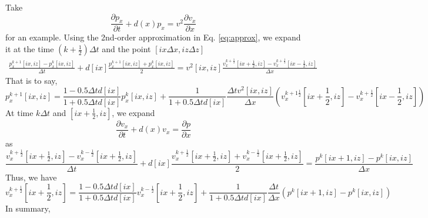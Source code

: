 Take
\begin{displaymath}
\frac{\partial p_x}{\partial t}+d(x)p_x = v^2 \frac{\partial v_x}{\partial x}
\end{displaymath}
for an example. Using the 2nd-order approximation in Eq. \eqref{eq:approx}, we expand it at the time $(k+\frac{1}{2})\Delta t$ and the point $[ix\Delta x, iz\Delta z]$
\begin{equation}
\begin{split} 
\frac{p_x^{k+1}[ix, iz]-p_x^{k}[ix, iz]}{\Delta t}+d[ix]\frac{p_x^{k+1}[ix, iz]+p_x^{k}[ix, iz]}{2}
= v^2[ix,iz]\frac{v_x^{k+\frac{1}{2}}[ix+\frac{1}{2}, iz]-v_x^{k+\frac{1}{2}}[ix-\frac{1}{2}, iz]}{\Delta x}
\end{split}
\end{equation}
That is to say,
\begin{equation}
p_x^{k+1}[ix,iz]=\frac{1-0.5\Delta td[ix]}{1+0.5\Delta t d[ix]}p_x^{k}[ix,iz]+\frac{1}{1+0.5\Delta t d[ix]}\frac{\Delta t v^2[ix,iz]}{\Delta x}(v_x^{k+1\frac{1}{2}}[ix+\frac{1}{2},iz]-v_x^{k+\frac{1}{2}}[ix-\frac{1}{2},iz]) 
\end{equation}
At time $k\Delta t$ and $[ix+\frac{1}{2},iz]$, we expand
\begin{displaymath}
\frac{\partial v_x}{\partial t}+d(x)v_x = \frac{\partial p}{\partial x}
\end{displaymath}
as
\begin{equation}
\frac{v_x^{k+\frac{1}{2}}[ix+\frac{1}{2}, iz]-v_x^{k-\frac{1}{2}}[ix+\frac{1}{2}, iz]}{\Delta t}+d[ix]\frac{v_x^{k+\frac{1}{2}}[ix+\frac{1}{2}, iz]+v_x^{k-\frac{1}{2}}[ix+\frac{1}{2}, iz]}{2}=\frac{p^{k}[ix+1, iz]-p^{k}[ix, iz]}{\Delta x}
\end{equation}
Thus, we have
\begin{equation}
v_x^{k+\frac{1}{2}}[ix+\frac{1}{2},iz]=\frac{1-0.5\Delta td[ix]}{1+0.5\Delta t d[ix]}v_x^{k-\frac{1}{2}}[ix+\frac{1}{2},iz]+\frac{1}{1+0.5\Delta t d[ix]}\frac{\Delta t}{\Delta x}(p^k[ix+1,iz]-p^k[ix,iz])
\end{equation}
In summary,
